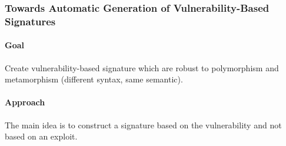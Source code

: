 \subsubsection{\cite{BNS-SP06} Towards Automatic Generation of Vulnerability-Based Signatures} 

\paragraph{Goal}
Create vulnerability-based signature which are robust to polymorphism and metamorphism (different syntax, same semantic).

\paragraph{Approach}
The main idea is to construct a signature based on the vulnerability and not based on an exploit. 

